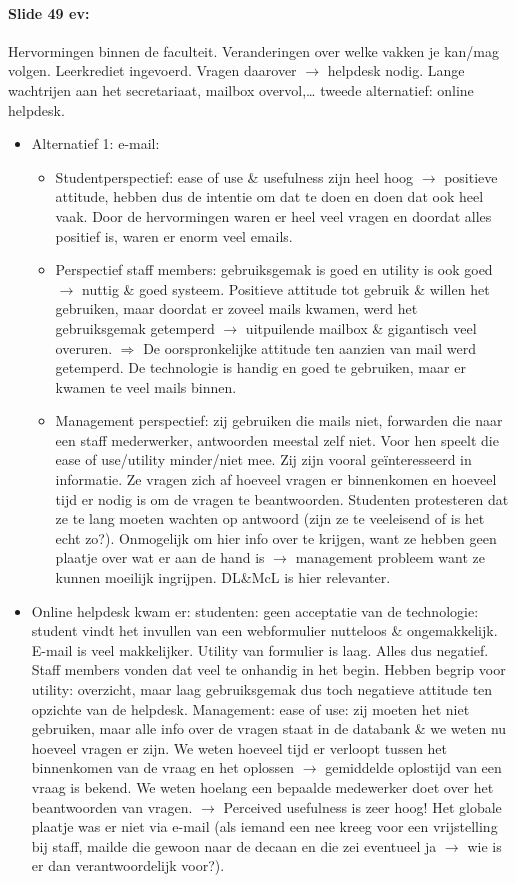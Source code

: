\documentclass[10pt,a4paper]{report}
\begin{document}
\paragraph{Slide 49 ev:}Hervormingen binnen de faculteit. Veranderingen over welke vakken je kan/mag volgen. Leerkrediet ingevoerd. Vragen daarover $\rightarrow$ helpdesk nodig. Lange wachtrijen aan het secretariaat, mailbox overvol,… tweede alternatief: online helpdesk.
\begin{itemize}
\item Alternatief 1: e-mail:
\begin{itemize}
\item Studentperspectief: ease of use \& usefulness zijn heel hoog $\rightarrow$ positieve attitude, hebben dus de intentie om dat te doen en doen dat ook heel vaak. Door de hervormingen waren er heel veel vragen en doordat alles positief is, waren er enorm veel emails.\\
\item Perspectief staff members: gebruiksgemak is goed en utility is ook goed $\rightarrow$ nuttig \& goed systeem. Positieve attitude tot gebruik \& willen het gebruiken, maar doordat er zoveel mails kwamen, werd het gebruiksgemak getemperd $\rightarrow$ uitpuilende mailbox \& gigantisch veel overuren. $\Rightarrow$ De oorspronkelijke attitude ten aanzien van mail werd getemperd. 
De technologie is handig en goed te gebruiken, maar er kwamen te veel mails binnen. 
\item Management perspectief: zij gebruiken die mails niet, forwarden die naar een staff mederwerker, antwoorden meestal zelf niet. Voor hen speelt die ease of use/utility minder/niet mee. Zij zijn vooral geïnteresseerd in informatie. Ze vragen zich af hoeveel vragen er binnenkomen en hoeveel tijd er nodig is om de vragen te beantwoorden. 
Studenten protesteren dat ze te lang moeten wachten op antwoord (zijn ze te veeleisend of is het echt zo?). Onmogelijk om hier info over te krijgen, want ze hebben geen plaatje over wat er aan de hand is $\rightarrow$ management probleem want ze kunnen moeilijk ingrijpen. DL\&McL is hier relevanter.
\end{itemize}
\item Online helpdesk kwam er: studenten: geen acceptatie van de technologie: student vindt het invullen van een webformulier nutteloos \& ongemakkelijk. E-mail is veel makkelijker. Utility van formulier is laag. Alles dus negatief. Staff members vonden dat veel te onhandig in het begin. Hebben begrip voor utility: overzicht, maar laag gebruiksgemak dus toch negatieve attitude ten opzichte van de helpdesk. Management: ease of use: zij moeten het niet gebruiken, maar alle info over de vragen staat in de databank \& we weten nu hoeveel vragen er zijn. We weten hoeveel tijd er verloopt tussen het binnenkomen van de vraag en het oplossen $\rightarrow$ gemiddelde oplostijd van een vraag is bekend. We weten hoelang een bepaalde medewerker doet over het beantwoorden van vragen. $\rightarrow$ Perceived usefulness is zeer hoog! Het globale plaatje was er niet via e-mail (als iemand een nee kreeg voor een vrijstelling bij staff, mailde die gewoon naar de decaan en die zei eventueel ja $\rightarrow$ wie is er dan verantwoordelijk voor?).
\end{itemize}
\end{document}
